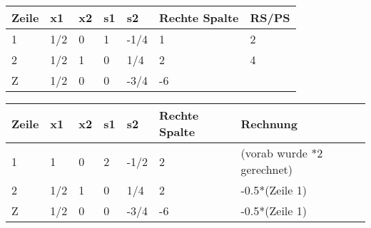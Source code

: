 \begin{table}[!ht]
\begin{tabular}{|l|l|l|l|l|l|l|}
\hline
\rowcolor[HTML]{C0C0C0} 
Zeile                     & x1                          & x2                        & s1                        & s2                          & Rechte Spalte             & RS/PS \\ \hline
\rowcolor[HTML]{9698ED} 
\cellcolor[HTML]{C0C0C0}1 & \cellcolor[HTML]{CE6301}1/2 & 0                         & 1                         & -1/4                        & 1                         & 2     \\ \hline
\cellcolor[HTML]{C0C0C0}2 & \cellcolor[HTML]{68CBD0}1/2 & \cellcolor[HTML]{FFFFFF}1 & \cellcolor[HTML]{FFFFFF}0 & \cellcolor[HTML]{FFFFFF}1/4 & \cellcolor[HTML]{FFFFFF}2 & 4     \\ \hline
\cellcolor[HTML]{C0C0C0}Z & \cellcolor[HTML]{68CBD0}1/2 & \cellcolor[HTML]{FFFFFF}0 & 0                         & -3/4                        & -6                        &       \\ \hline
\end{tabular}
\end{table}

\begin{table}[!ht]
\begin{tabular}{|l|l|l|l|l|l|l|}
\hline
\rowcolor[HTML]{C0C0C0} 
Zeile                     & x1  & x2 & s1 & s2   & Rechte Spalte & Rechnung                   \\ \hline
\rowcolor[HTML]{FFFFFF} 
\cellcolor[HTML]{C0C0C0}1 & 1   & 0  & 2  & -1/2 & 2             & (vorab wurde *2 gerechnet) \\ \hline
\rowcolor[HTML]{FFFFFF} 
\cellcolor[HTML]{C0C0C0}2 & 1/2 & 1  & 0  & 1/4  & 2             & -0.5*(Zeile 1)             \\ \hline
\rowcolor[HTML]{FFFFFF} 
\cellcolor[HTML]{C0C0C0}Z & 1/2 & 0  & 0  & -3/4 & -6            & -0.5*(Zeile 1)             \\ \hline
\end{tabular}
\end{table}

